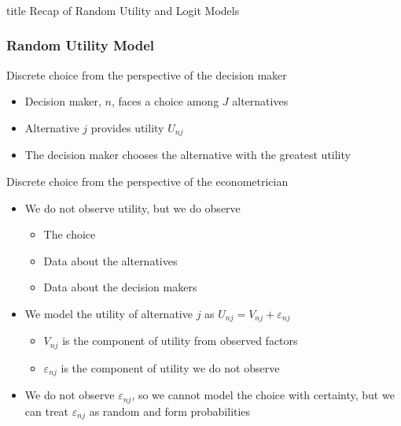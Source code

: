 \documentclass{beamer}\usepackage[]{graphicx}\usepackage[]{color}
\begin{document}
\begin{frame}\frametitle{}
    \vfill
    \centering
    \begin{beamercolorbox}[center]{title}
        \Large Recap of Random Utility and Logit Models
    \end{beamercolorbox}
    \vfill
\end{frame}

\begin{frame}\frametitle{Random Utility Model}
	Discrete choice from the perspective of the decision maker
	\begin{itemize}
		\item Decision maker, $n$, faces a choice among $J$ alternatives
		\item Alternative $j$ provides utility $U_{nj}$
		\item The decision maker chooses the alternative with the greatest utility
	\end{itemize}
	\vspace{2ex}
	Discrete choice from the perspective of the econometrician
	\begin{itemize}
		\item We do not observe utility, but we do observe
		\begin{itemize}
			\item The choice
			\item Data about the alternatives
			\item Data about the decision makers
		\end{itemize}
		\item We model the utility of alternative $j$ as $U_{nj} = V_{nj} + \varepsilon_{nj}$
		\begin{itemize}
			\item $V_{nj}$ is the component of utility from observed factors
			\item $\varepsilon_{nj}$ is the component of utility we do not observe
		\end{itemize}
		\item We do not observe $\varepsilon_{nj}$, so we cannot model the choice with certainty, but we can treat $\varepsilon_{nj}$ as random and form probabilities
	\end{itemize}
\end{frame}
\end{document}
